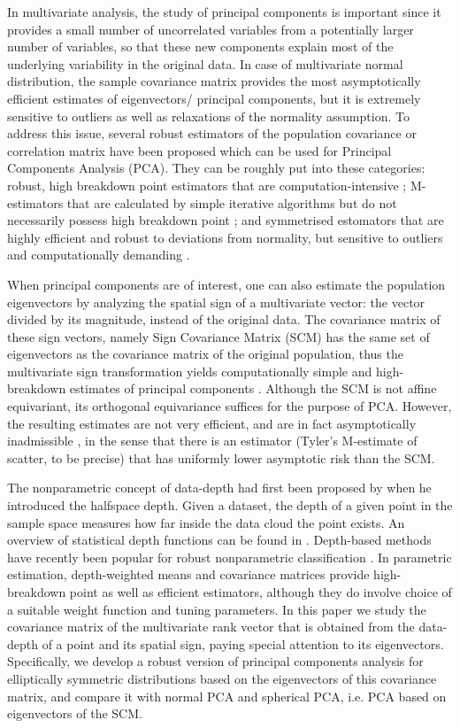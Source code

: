 \documentclass[fleqn,11pt]{article}
\begin{document}
In multivariate analysis, the study of principal components is important since it provides a small number of uncorrelated variables from a potentially larger number of variables, so that these new components explain most of the underlying variability in the original data. In case of multivariate normal distribution, the sample covariance matrix provides the most asymptotically efficient estimates of eigenvectors/ principal components, but it is extremely sensitive to outliers as well as relaxations of the normality assumption. To address this issue, several robust estimators of the population covariance or correlation matrix have been proposed which can be used for Principal Components Analysis (PCA). They can be roughly put into these categories: robust, high breakdown point estimators that are computation-intensive \citep{rousseeuw85, maronna76}; M-estimators that are calculated by simple iterative algorithms but do not necessarily possess high breakdown point \citep{huber77, tyler87}; and symmetrised estomators that are highly efficient and robust to deviations from normality, but sensitive to outliers and computationally demanding \citep{dumbgen98, sirkia07}.

When principal components are of interest, one can also estimate the population eigenvectors by analyzing the spatial sign of a multivariate vector: the vector divided by its magnitude, instead of the original data. The covariance matrix of these sign vectors, namely Sign Covariance Matrix (SCM) has the same set of eigenvectors as the covariance matrix of the original population, thus the multivariate sign transformation yields computationally simple and high-breakdown estimates of principal components \citep{locantore99, visuri00}. Although the SCM is not affine equivariant, its orthogonal equivariance suffices for the purpose of PCA. However, the resulting estimates are not very efficient, and are in fact asymptotically inadmissible \citep{magyar14}, in the sense that there is an estimator (Tyler's M-estimate of scatter, to be precise) that has uniformly lower asymptotic risk than the SCM.

The nonparametric concept of data-depth had first been proposed by \cite{tukey75} when he introduced the halfspace depth. Given a dataset, the depth of a given point in the sample space measures how far inside the data cloud the point exists. An overview of statistical depth functions can be found in \citep{zuo00}. Depth-based methods have recently been popular for robust nonparametric classification \citep{jornsten04, ghosh05, dutta12, sguera14}. In parametric estimation, depth-weighted means \citep{ZuoCuiHe04} and covariance matrices \citep{ZuoCui05} provide high-breakdown point as well as efficient estimators, although they do involve choice of a suitable weight function and tuning parameters. In this paper we study the covariance matrix of the multivariate rank vector that is obtained from the data-depth of a point and its spatial sign, paying special attention to its eigenvectors. Specifically, we develop a robust version of principal components analysis for elliptically symmetric distributions based on the eigenvectors of this covariance matrix, and compare it with normal PCA and spherical PCA, i.e. PCA based on eigenvectors of the SCM.
\end{document}
